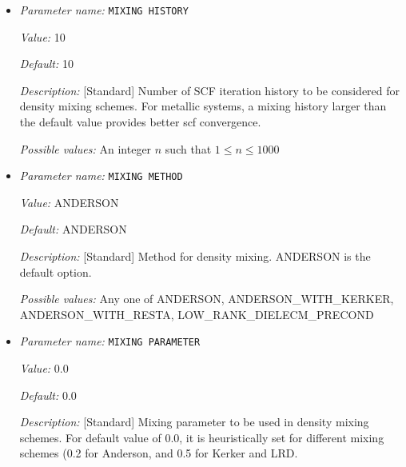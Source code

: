 \begin{itemize}
{\it Value:} 200


{\it Default:} 200


{\it Description:} [Standard] Maximum number of iterations to be allowed for SCF convergence


{\it Possible values:} An integer $n$ such that $1\leq n \leq 1000$
\item {\it Parameter name:} {\tt MIXING HISTORY}
\label{parameters:SCF parameters/MIXING HISTORY}
\label{parameters:SCF_20parameters/MIXING_20HISTORY}


{\it Value:} 10


{\it Default:} 10


{\it Description:} [Standard] Number of SCF iteration history to be considered for density mixing schemes. For metallic systems, a mixing history larger than the default value provides better scf convergence.


{\it Possible values:} An integer $n$ such that $1\leq n \leq 1000$
\item {\it Parameter name:} {\tt MIXING METHOD}
\label{parameters:SCF parameters/MIXING METHOD}
\label{parameters:SCF_20parameters/MIXING_20METHOD}


{\it Value:} ANDERSON


{\it Default:} ANDERSON


{\it Description:} [Standard] Method for density mixing. ANDERSON is the default option.


{\it Possible values:} Any one of ANDERSON, ANDERSON\_WITH\_KERKER, ANDERSON\_WITH\_RESTA, LOW\_RANK\_DIELECM\_PRECOND
\item {\it Parameter name:} {\tt MIXING PARAMETER}
\label{parameters:SCF parameters/MIXING PARAMETER}
\label{parameters:SCF_20parameters/MIXING_20PARAMETER}


{\it Value:} 0.0


{\it Default:} 0.0


{\it Description:} [Standard] Mixing parameter to be used in density mixing schemes. For default value of 0.0, it is heuristically set for different mixing schemes (0.2 for Anderson, and 0.5 for Kerker and LRD.



\end{itemize}
